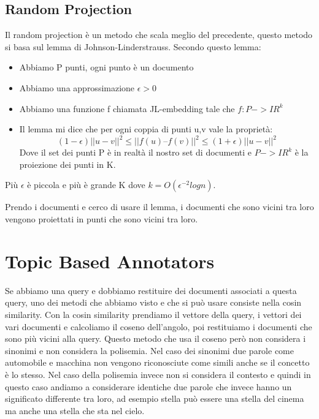 \documentclass[14pt]{extreport}
\begin{document}
\section{Random Projection}

Il random projection è un metodo che scala meglio del precedente, questo metodo si basa sul lemma di Johnson-Linderstrauss. 
Secondo questo lemma:
\begin{itemize}
    \item Abbiamo P punti, ogni punto è un documento
    \item Abbiamo una approssimazione $\epsilon>0$
    \item Abbiamo una funzione f chiamata JL-embedding tale che $f:P->IR^k$
    \item Il lemma mi dice che per ogni coppia di punti u,v vale la proprietà:
    \begin{equation}
        (1 - \epsilon) ||u - v||^2 \leq ||f(u) – f(v)||^2 \leq (1 + \epsilon) ||u-v||^2
    \end{equation}
    Dove il set dei punti P è in realtà il nostro set di documenti e $P->IR^k$ è la proiezione dei punti in K.
\end{itemize}

Più $\epsilon$ è piccola e più è grande K dove $k = O(\epsilon^{-2}logn)$.

Prendo i documenti e cerco di usare il lemma, i documenti che sono vicini tra loro vengono proiettati in punti che sono vicini tra loro.

\chapter{Topic Based Annotators}

Se abbiamo una query e dobbiamo restituire dei documenti associati a questa query, uno dei metodi che abbiamo visto e che si può usare consiste nella cosin similarity. 
Con la cosin similarity prendiamo il vettore della query, i vettori dei vari documenti e calcoliamo il coseno dell'angolo, poi restituiamo i documenti che sono più vicini alla query.
Questo metodo che usa il coseno però non considera i sinonimi e non considera la polisemia. Nel caso dei sinonimi due parole come automobile e macchina non vengono riconosciute come simili anche se il concetto è lo stesso. Nel caso della polisemia invece non si considera il contesto e quindi in questo caso andiamo a considerare identiche due parole che invece hanno un significato differente tra loro, ad esempio stella può essere una stella del cinema ma anche una stella che sta nel cielo.
\end{document}
